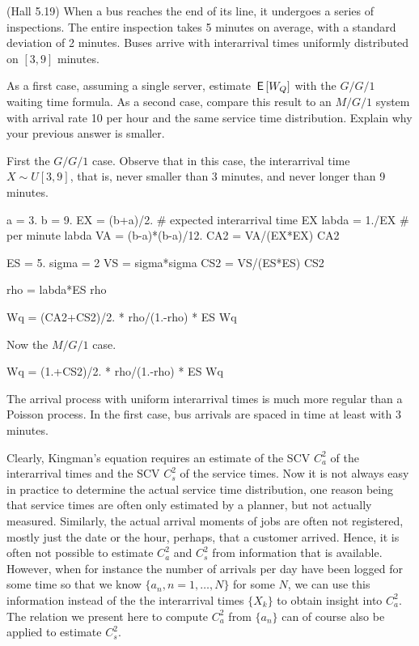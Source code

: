 \begin{exercise}
  (Hall 5.19) When a bus reaches the end of its line, it undergoes a
  series of inspections. The entire inspection takes 5 minutes on
  average, with a standard deviation of 2 minutes. Buses arrive with
  interarrival times uniformly distributed on $[3,9]$ minutes.

As a first case,  assuming a single server, estimate $\,\mathsf{E}\left[W_Q\right]$ with the $G/G/1$ waiting time formula. As a second case, compare this result to an $M/G/1$ system with arrival rate 10 per hour and the same service time distribution. Explain why your previous answer is smaller. 
  \begin{solution}
First the $G/G/1$ case. Observe that in this case, the interarrival time $X\sim U[3,9]$, that is, never smaller than 3 minutes, and never longer than 9 minutes. 

\begin{pyconsole}
  
a = 3.
b = 9. 
EX = (b+a)/2. # expected interarrival time
EX
labda = 1./EX # per minute
labda
VA = (b-a)*(b-a)/12.
CA2 = VA/(EX*EX)
CA2

ES = 5.
sigma = 2
VS = sigma*sigma
CS2 = VS/(ES*ES)
CS2

rho = labda*ES
rho

Wq = (CA2+CS2)/2. * rho/(1.-rho) * ES
Wq
\end{pyconsole}

Now  the $M/G/1$ case.

\begin{pyconsole}
Wq = (1.+CS2)/2. * rho/(1.-rho) * ES
Wq
\end{pyconsole}

The arrival process with uniform interarrival times is much more
regular than a Poisson process. In the first case, bus arrivals are
spaced in time at least with 3 minutes.
    \end{solution}
\end{exercise}



Clearly, Kingman's equation requires an estimate of the SCV $C_a^2$ of
the interarrival times and the SCV $C_s^2$ of the service times. Now
it is not always easy in practice to determine the actual service time
distribution, one reason being that service times are often only
estimated by a planner, but not actually measured. Similarly, the
actual arrival moments of jobs are often not registered, mostly just
the date or the hour, perhaps, that a customer arrived.  Hence, it is
often not possible to estimate $C_a^2$ and $C_s^2$ from information
that is available.  However, when for instance the number of arrivals
per day have been logged for some time so that we know
$\{a_n, n=1,\ldots, N\}$ for some $N$, we can use this information
instead of the the interarrival times $\{X_k\}$ to obtain insight into
$C_a^2$.  The relation we present here to compute $C_a^2$ from
$\{a_n\}$ can of course also be applied to estimate $C_s^2$.

